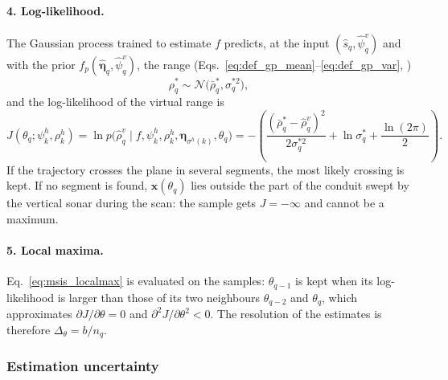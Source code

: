 \paragraph{4. Log-likelihood.} The Gaussian process trained to estimate $f$ predicts, at the input
$(\hat{s}_q, \hat{\psi}^v_q)$ and with the prior $f_p(\hat{\boldsymbol{\eta}}_q, \hat{\psi}^v_q)$, the
range (Eqs.~\eqref{eq:def_gp_mean}--\eqref{eq:def_gp_var}, \citealt[Eqs.~2.25--2.26]{rasmussen2006gaussian})
\begin{equation}                         %
  \rho^{*}_q \sim \mathcal{N}\big(\bar{\rho}^{*}_q, \sigma^{*2}_q\big),
  \label{eq:msis_gppred}
\end{equation}
and the log-likelihood of the virtual range is
\begin{equation}                         %
  J(\theta_q; \psi^h_k, \rho^h_k) = \ln p\big(\hat{\rho}^v_q \mid f, \psi^h_k, \rho^h_k,
  \boldsymbol{\eta}_{\sigma^h(k)}, \theta_q\big)
  = -\left( \frac{(\bar{\rho}^{*}_q - \hat{\rho}^v_q)^2}{2\sigma^{*2}_q} + \ln \sigma^{*}_q + \frac{\ln(2\pi)}{2} \right).
  \label{eq:msis_loglik}
\end{equation}
If the trajectory crosses the plane in several segments, the most likely crossing is kept. If no
segment is found, $\mathbf{x}(\theta_q)$ lies outside the part of the conduit swept by the vertical
sonar during the scan: the sample gets $J = -\infty$ and cannot be a maximum.

\paragraph{5. Local maxima.} Eq.~\eqref{eq:msis_localmax} is evaluated on the samples: $\theta_{q-1}$
is kept when its log-likelihood is larger than those of its two neighbours $\theta_{q-2}$ and
$\theta_q$, which approximates $\partial J / \partial\theta = 0$ and $\partial^2 J / \partial\theta^2 < 0$.
The resolution of the estimates is therefore $\Delta_\theta = b / n_q$.

\FloatBarrier                            %
\subsubsection{Estimation uncertainty}   %
\label{sec:msis_uncertainty}             %

